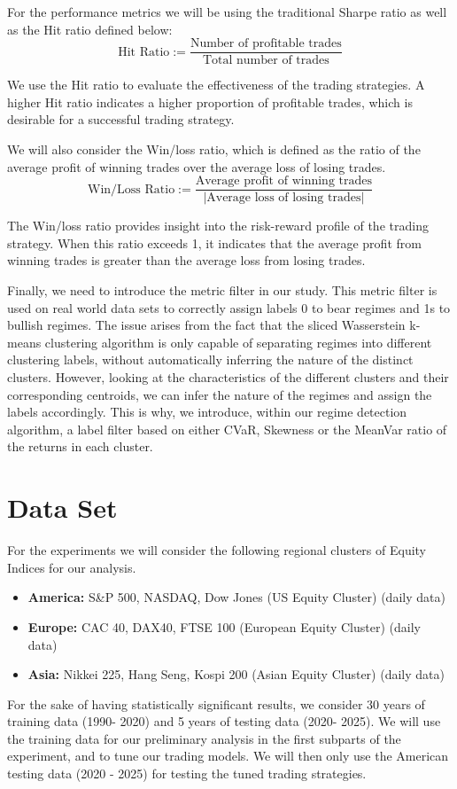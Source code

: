 \documentclass[12pt,a4paper]{report}
\begin{document}
For the performance metrics we will be using the traditional Sharpe ratio as well as the Hit ratio defined below: 
\begin{equation}
  \text{Hit Ratio} := \frac{\text{Number of profitable trades}}{\text{Total number of trades}} 
\end{equation}

We use the Hit ratio to evaluate the effectiveness of the trading strategies. A higher Hit ratio indicates a higher proportion of profitable trades, which is desirable for a successful trading strategy.

We will also consider the Win/loss ratio, which is defined as the ratio of the average profit of winning trades over the average loss of losing trades.
\begin{equation}
  \text{Win/Loss Ratio} := \frac{\text{Average profit of winning trades}}{\left|\text{Average loss of losing trades}\right|}
\end{equation}

The Win/loss ratio provides insight into the risk-reward profile of the trading strategy. 
When this ratio exceeds 1, it indicates that the average profit from winning trades is greater than the average loss from losing trades. 

Finally, we need to introduce the metric filter in our study. This metric filter is used on real world data sets to correctly assign labels 0 to bear regimes and 1s to bullish regimes.
The issue arises from the fact that the sliced Wasserstein k-means clustering algorithm is only capable of separating regimes into different clustering labels, without automatically inferring the nature of the distinct clusters.
However, looking at the characteristics of the different clusters and their corresponding centroids, we can infer the nature of the regimes and assign the labels accordingly.
This is why, we introduce, within our regime detection algorithm, a label filter based on either CVaR, Skewness or the MeanVar ratio of the returns in each cluster.



\section{Data Set}
For the experiments we will consider the following regional clusters of Equity Indices for our analysis.
\begin{itemize}
  \item \textbf{America:} S\&P 500, NASDAQ, Dow Jones (US Equity Cluster) (daily data)
  \item \textbf{Europe:} CAC 40, DAX40, FTSE 100 (European Equity Cluster) (daily data)
  \item \textbf{Asia:} Nikkei 225, Hang Seng, Kospi 200 (Asian Equity Cluster) (daily data)
\end{itemize}
For the sake of having statistically significant results, we consider 30 years of training data (1990- 2020) and 5 years of testing data (2020- 2025).
We will use the training data for our preliminary analysis in the first subparts of the experiment, and to tune our trading models. 
We will then only use the American testing data (2020 - 2025) for testing the tuned trading strategies. 
\end{document}
